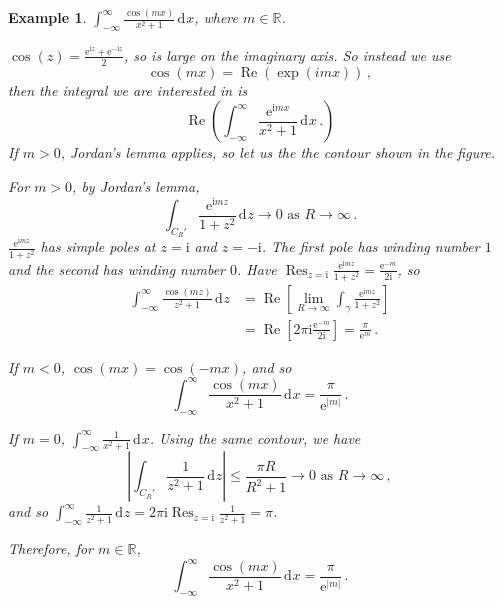 \documentclass{article}
\theoremstyle{plain}\theoremheaderfont{\normalfont\itshape}\theorembodyfont{\rmfamily}\theoremseparator{.}\newtheorem*{rem}{Remark}\newtheorem*{ex}{Example}\newtheorem*{proof}{Proof}\newtheorem*{altp}{Alternative proof}\newtheorem*{con}{Consequences}\newtheorem*{notn}{Notations}\newtheorem*{cau}{Caution}\newtheorem*{term}{Terminology}\newtheorem*{keyex}{Key example}
\theoremstyle{plain}\theoremheaderfont{\normalfont\bfseries}\theorembodyfont{\rmfamily}\theoremseparator{.}\newtheorem{thm}{Theorem}[section]\newtheorem{lem}[thm]{Lemma}\newtheorem{prop}[thm]{Proposition}\newtheorem*{cor}{Corollary}\newtheorem{defn}[thm]{Definition}\newtheorem{clm}[thm]{Claim}\newtheorem{clminproof}{Claim}\newtheorem{leminproof}{Lemma}\newtheorem{app}{Application}
\theoremstyle{break}\theoremheaderfont{\normalfont\itshape}\theorembodyfont{\rmfamily}\theoremseparator{.\medskip}\newtheorem*{proofskip}{Proof}\newtheorem*{exs}{Examples}\newtheorem*{rems}{Remarks}\newtheorem*{rec}{Recall}\newtheorem*{ppts}{Properties}
\theoremstyle{break}\theoremheaderfont{\normalfont\bfseries}\theorembodyfont{\rmfamily}\theoremseparator{.\medskip}\newtheorem{lemskip}[thm]{Lemma}\newtheorem{defnskip}[thm]{Definition}\newtheorem{propskip}[thm]{Proposition}\newtheorem{thmskip}[thm]{Theorem}
\numberwithin{equation}{section}
\newcommand{\ii}{\mathrm{i}}
\newcommand{\ee}{\mathrm{e}}
\DeclareMathOperator*{\Res}{Res}
\newcommand{\abs}[1]{\left|#1\right|}
\newcommand{\dd}[2][]{\,\mathrm{d}^{#1} #2}
\newcommand{\RR}{\mathbb{R}}
\renewcommand{\Re}{\operatorname{Re}}
\begin{document}
    \begin{ex}
        \(\int_{-\infty}^{\infty}\frac{\cos(mx)}{x^2+1}\dd{x}\), where \(m\in\RR\).

        \begin{figure}[ht!]
            \centering
        \end{figure}

        \(\cos(z)=\frac{\ee^{\ii z}+\ee^{-\ii z}}{2}\), so is large on the imaginary axis. So instead we use
        \[\cos(mx)=\Re(\exp(imx))\,,\]
        then the integral we are interested in is
        \[\Re\left(\int_{-\infty}^{\infty}\frac{\ee^{\ii mx}}{x^2+1}\dd{x}\,.\right)\]
        If \(m>0\), Jordan's lemma applies, so let us the the contour shown in the figure.

        For \(m>0\), by Jordan's lemma,
        \[\int_{C_R'}\frac{\ee^{\ii mz}}{1+z^2}\dd{z}\to 0\text{ as }R\to \infty\,.\]
        \(\frac{\ee^{\ii mz}}{1+z^2}\) has simple poles at \(z=\ii\) and \(z=-\ii\). The first pole has winding number \(1\) and the second has winding number \(0\). Have \(\Res_{z=\ii}\frac{\ee^{\ii mz}}{1+z^2}=\frac{\ee^{-m}}{2\ii}\), so 
        \begin{align*}
            \int_{-\infty}^{\infty}\frac{\cos(mz)}{z^2+1}\dd{z}&=\Re\left[\lim_{R\to\infty}\int_{\gamma}\frac{\ee^{\ii mz}}{1+z^2}\right]\\
            &=\Re\left[2\pi \ii\frac{\ee^{-m}}{2\ii}\right]=\frac{\pi}{\ee^m}\,.
        \end{align*}

        If \(m<0\), \(\cos(mx)=\cos(-mx)\), and so
        \[\int_{-\infty}^{\infty}\frac{\cos(mx)}{x^2+1}\dd{x}=\frac{\pi}{\ee^{\abs{m}}}\,.\]

        If \(m=0\), \(\int_{-\infty}^{\infty}\frac{1}{x^2+1}\dd{x}\). Using the same contour, we have
        \[\abs{\int_{C_R'}\frac{1}{z^2+1}\dd{z}}\le\frac{\pi R}{R^2+1}\to 0\text{ as }R\to\infty\,,\]
        and so \(\int_{-\infty}^{\infty}\frac{1}{z^2+1}\dd{z}=2\pi \ii\Res_{z=\ii}\frac{1}{z^2+1}=\pi\).

        Therefore, for \(m\in\RR\),
        \[\int_{-\infty}^{\infty}\frac{\cos(mx)}{x^2+1}\dd{x}=\frac{\pi}{\ee^{\abs{m}}}\,.\]        
    \end{ex}
\end{document}
